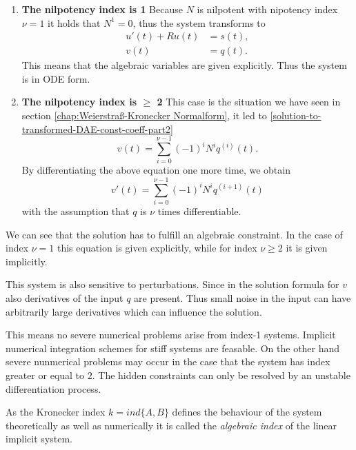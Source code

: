 \begin{enumerate}
	\item \textbf{The nilpotency index is 1} \newline
		Because $N$ is nilpotent with nipotency index $\nu = 1$ it holds that $N^1 = 0$, thus the system transforms to
		\begin{align*}
			u'(t) + Ru(t) &= s(t), \\
			v(t) &= q(t).
		\end{align*}
		This means that the algebraic variables are given explicitly. Thus the system is in ODE form.

	\item \textbf{The nilpotency index is $\geq$ 2} \newline
		This case is the situation we have seen in section \ref{chap:Weierstraß-Kronecker Normalform}, it led to \eqref{solution-to-transformed-DAE-const-coeff-part2}
		\begin{displaymath}
			v(t) = \sum_{i=0}^{\nu-1} (-1)^iN^iq^{(i)}(t).
		\end{displaymath}
		By differentiating the above equation one more time, we obtain
		\begin{equation}
			v'(t) = \sum_{i=0}^{\nu-1} (-1)^iN^iq^{(i+1)}(t)
		\end{equation}
		with the assumption that $q$ is $\nu$ times differentiable.
\end{enumerate}

We can see that the solution has to fulfill an algebraic constraint. In the case of index $\nu = 1$ this equation is given explicitly, while for index $\nu \geq 2$ it is given implicitly.

This system is also sensitive to perturbations. Since in the solution formula for $v$ also derivatives of the input $q$ are present. Thus small noise in the input can have arbitrarily large derivatives which can influence the solution.

This means no severe numerical problems arise from index-1 systems. Implicit numerical integration schemes for stiff systems are feasable. On the other hand severe nunmerical problems may occur in the case that the system has index greater or equal to $2$. The hidden constraints can only be resolved by an unstable differentiation process.

As the Kronecker index $k=ind\{A,B\}$ defines the behaviour of the system theoretically as well as numerically it is called the \emph{algebraic index} of the linear implicit system.

